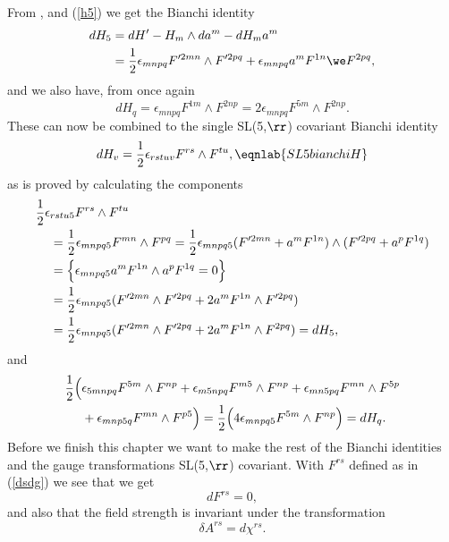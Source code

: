 From ,  and (\ref{h5}) we get the Bianchi identity
\begin{align}
dH_5 &=dH'-H_m \wedge da^m -dH_ma^m \nonumber \\
&= {1 \over 2}\epsilon_{mnpq}F'^{2mn} \wedge F'^{2pq} + \epsilon_{mnpq}a^mF^{1n}\we F^{2pq},
\end{align}
and we also have, from  once again
\begin{equation}
dH_q=\epsilon_{mnpq}F^{1m} \wedge F^{2np}=2\epsilon_{mnpq}F^{5m} \wedge F^{2np}.
\end{equation}
These can now be combined to the single SL(5,$\rr$) covariant Bianchi identity
\begin{equation}
dH_v={1 \over 2}\epsilon_{rstuv}F^{rs} \wedge F^{tu},
\eqnlab{SL5bianchiH}
\end{equation}
as is proved by calculating the components
\begin{align}
{1 \over 2}\epsilon&_{rstu5}F^{rs} \wedge F^{tu} \nonumber \\
&={1 \over 2}\epsilon_{mnpq5}F^{mn} \wedge F^{pq} ={1 \over 2}\epsilon_{mnpq5}(F'^{2mn} + a^m F^{1n}) \wedge (F'^{2pq} + a^p F^{1q}) \nonumber \\
&=\Big{\{} \epsilon_{mnpq5}a^m F^{1n} \wedge a^p F^{1q} =0\Big{\}} \nonumber \\
&={1 \over 2}\epsilon_{mnpq5}(F'^{2mn} \wedge F'^{2pq} + 2 a^m F^{1n} \wedge F'^{2pq}) \nonumber \\
&={1 \over 2}\epsilon_{mnpq5}(F'^{2mn} \wedge F'^{2pq} + 2 a^m F^{1n} \wedge F^{2pq})=dH_5,
\end{align}
and
\begin{align}
{1 \over 2}\Big{(}& \epsilon_{5mnpq}F^{5m} \wedge F^{np} + \epsilon_{m5npq}F^{m5} \wedge F^{np} + \epsilon_{mn5pq}F^{mn} \wedge F^{5p} \nonumber \\
&+ \epsilon_{mnp5q}F^{mn} \wedge F^{p5} \Big{)} = {1 \over 2}\Big{(}4\epsilon_{mnpq5}F^{5m} \wedge F^{np}\Big{)}=dH_q.
\end{align}
Before we finish this chapter we want to make the rest of the Bianchi identities and the gauge transformations SL(5,$\rr$) covariant. 
With $F^{rs}$ defined as in (\ref{dsdg}) we see that we get
\begin{equation}
dF^{rs}=0,
\end{equation}
and also that the field strength is invariant under the transformation
\begin{equation}
\delta A^{rs} = d\chi^{rs}.
\end{equation}
